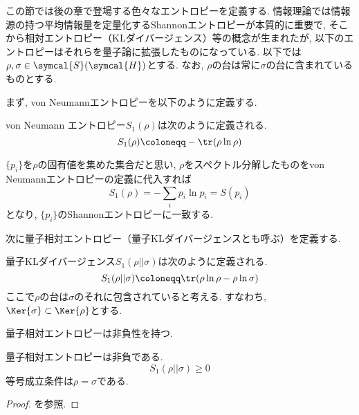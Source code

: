 
この節では後の章で登場する色々なエントロピーを定義する. 
情報理論では情報源の持つ平均情報量を定量化するShannonエントロピーが本質的に重要で, そこから相対エントロピー（KLダイバージェンス）等の概念が生まれたが, 以下のエントロピーはそれらを量子論に拡張したものになっている. 
以下では$\rho, \sigma\in\symcal{S}(\symcal{H})$とする. 
なお, $\rho$の台は常に$\sigma$の台に含まれているものとする. 

まず, von Neumannエントロピーを以下のように定義する. 

\begin{mydfn}\label{dfn.vonNeumannEntropy}
  von Neumann エントロピー$S_1(\rho)$は次のように定義される. 
  \begin{equation}
    S_1(\rho)\coloneqq -\tr(\rho\ln{\rho})
  \end{equation}
\end{mydfn}

$\{p_i\}$を$\rho$の固有値を集めた集合だと思い, $\rho$をスペクトル分解したものをvon Neumannエントロピーの定義に代入すれば
\begin{equation}
  S_1(\rho)=-\sum_{i}p_i\ln{p_i}=S(p_i)
\end{equation}
となり, $\{p_i\}$のShannonエントロピーに一致する. 

次に量子相対エントロピー（量子KLダイバージェンスとも呼ぶ）を定義する. 

\begin{mydfn}[量子KLダイバージェンス]\label{dfn.KLdiv}
  量子KLダイバージェンス$S_1(\rho||\sigma)$は次のように定義される. 
  \begin{equation}
    S_1(\rho||\sigma)\coloneqq \tr(\rho\ln{\rho}-\rho\ln{\sigma})
  \end{equation}
  ここで$\rho$の台は$\sigma$のそれに包含されていると考える. 
  すなわち, $\Ker{\sigma}\subset \Ker{\rho}$とする.
\end{mydfn}

量子相対エントロピーは非負性を持つ. 

\begin{mythm}[Kleinの不等式]
  量子相対エントロピーは非負である. 
  \begin{equation}
    S_1(\rho||\sigma)\geq 0
  \end{equation}
  等号成立条件は$\rho=\sigma$である. 
\end{mythm}

\begin{proof}
  \cite{nielsen2010quantum}を参照. 
\end{proof}

